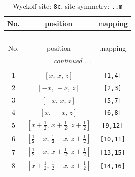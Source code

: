 \documentclass[fleqn,8pt]{jsarticle}
\begin{document}
\renewcommand{\arraystretch}{1.2}
\begin{longtable}{ccc}
\caption{Wyckoff site: {\tt 8c}, site symmetry: {\tt ..m}}
 \\
 \hline \hline
No. & position & mapping \\ \hline \endfirsthead

\multicolumn{2}{l}{\tablename\ \thetable{}} \\
 \hline \hline
No. & position & mapping \\ \hline \endhead

 \hline \hline
\multicolumn{2}{r}{\footnotesize\it continued ...} \\ \endfoot

 \hline \hline
\multicolumn{2}{r}{} \\ \endlastfoot

1 & $\left[ x,\, x,\, z \right]$ & {\tt [1,4]} \\ \hline
2 & $\left[ - x,\, - x,\, z \right]$ & {\tt [2,3]} \\ \hline
3 & $\left[ - x,\, x,\, z \right]$ & {\tt [5,7]} \\ \hline
4 & $\left[ x,\, - x,\, z \right]$ & {\tt [6,8]} \\ \hline
5 & $\left[ x + \frac{1}{2},\, x + \frac{1}{2},\, z + \frac{1}{2} \right]$ & {\tt [9,12]} \\ \hline
6 & $\left[ \frac{1}{2} - x,\, \frac{1}{2} - x,\, z + \frac{1}{2} \right]$ & {\tt [10,11]} \\ \hline
7 & $\left[ \frac{1}{2} - x,\, x + \frac{1}{2},\, z + \frac{1}{2} \right]$ & {\tt [13,15]} \\ \hline
8 & $\left[ x + \frac{1}{2},\, \frac{1}{2} - x,\, z + \frac{1}{2} \right]$ & {\tt [14,16]} \\
\end{longtable}
\renewcommand{\arraystretch}{1.2}
\end{document}
